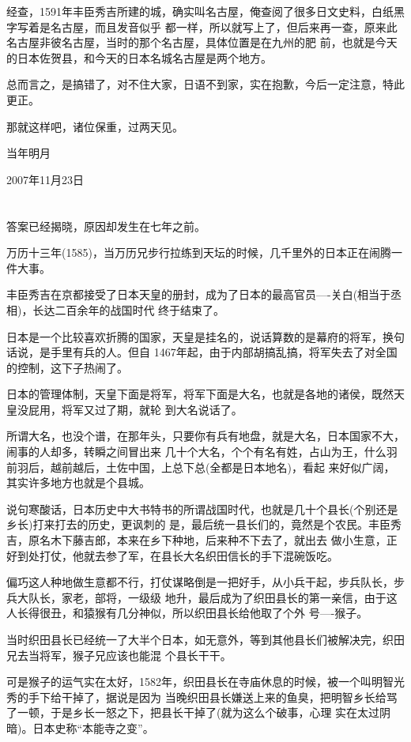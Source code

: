 \documentclass[11pt,a4paper,onecolumn]{article}
\begin{document}
经查，1591年丰臣秀吉所建的城，确实叫名古屋，俺查阅了很多日文史料，白纸黑字写着是名古屋，而且发音似乎
都一样，所以就写上了，但后来再一查，原来此名古屋非彼名古屋，当时的那个名古屋，具体位置是在九州的肥
前，也就是今天的日本佐贺县，和今天的日本名城名古屋是两个地方。

总而言之，是搞错了，对不住大家，日语不到家，实在抱歉，今后一定注意，特此更正。

那就这样吧，诸位保重，过两天见。

当年明月

2007年11月23日

\section[\thesection]{}

答案已经揭晓，原因却发生在七年之前。

万历十三年(1585)，当万历兄步行拉练到天坛的时候，几千里外的日本正在闹腾一件大事。

丰臣秀吉在京都接受了日本天皇的册封，成为了日本的最高官员----关白(相当于丞相)，长达二百余年的战国时代
终于结束了。

日本是一个比较喜欢折腾的国家，天皇是挂名的，说话算数的是幕府的将军，换句话说，是手里有兵的人。但自
1467年起，由于内部胡搞乱搞，将军失去了对全国的控制，这下子热闹了。

日本的管理体制，天皇下面是将军，将军下面是大名，也就是各地的诸侯，既然天皇没屁用，将军又过了期，就轮
到大名说话了。

所谓大名，也没个谱，在那年头，只要你有兵有地盘，就是大名，日本国家不大，闹事的人却多，转瞬之间冒出来
几十个大名，个个有名有姓，占山为王，什么羽前羽后，越前越后，土佐中国，上总下总(全都是日本地名)，看起
来好似广阔，其实许多地方也就是个县城。

说句寒酸话，日本历史中大书特书的所谓战国时代，也就是几十个县长(个别还是乡长)打来打去的历史，更讽刺的
是，最后统一县长们的，竟然是个农民。丰臣秀吉，原名木下藤吉郎，本来在乡下种地，后来种不下去了，就出去
做小生意，正好到处打仗，他就去参了军，在县长大名织田信长的手下混碗饭吃。

偏巧这人种地做生意都不行，打仗谋略倒是一把好手，从小兵干起，步兵队长，步兵大队长，家老，部将，一级级
地升，最后成为了织田县长的第一亲信，由于这人长得很丑，和猿猴有几分神似，所以织田县长给他取了个外
号----猴子。

当时织田县长已经统一了大半个日本，如无意外，等到其他县长们被解决完，织田兄去当将军，猴子兄应该也能混
个县长干干。

可是猴子的运气实在太好，1582年，织田县长在寺庙休息的时候，被一个叫明智光秀的手下给干掉了，据说是因为
当晚织田县长嫌送上来的鱼臭，把明智乡长给骂了一顿，于是乡长一怒之下，把县长干掉了(就为这么个破事，心理
实在太过阴暗)。日本史称``本能寺之变''。
\end{document}
